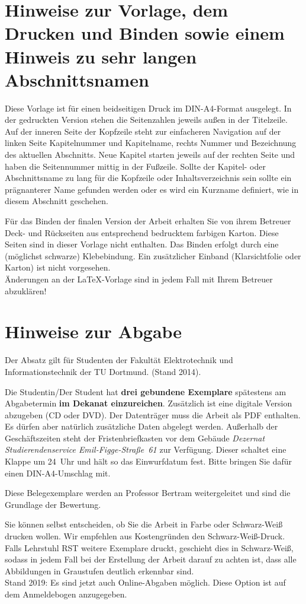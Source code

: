 \section[Vorlage, Drucken und Binden]{Hinweise zur Vorlage, dem Drucken und Binden sowie einem Hinweis zu sehr langen Abschnittsnamen}
\label{hinweise:vorlage}

Diese Vorlage ist für einen beidseitigen Druck im DIN-A4-Format ausgelegt. In der gedruckten Version stehen die Seitenzahlen jeweils außen in der Titelzeile. Auf der inneren Seite der Kopfzeile steht zur einfacheren Navigation auf der linken Seite Kapitelnummer und Kapitelname, rechts Nummer und Bezeichnung des aktuellen Abschnitts. Neue Kapitel starten jeweils auf der rechten Seite und haben die Seitennummer mittig in der Fußzeile.
Sollte der Kapitel- oder Abschnittsname zu lang für die Kopfzeile oder Inhaltsverzeichnis sein sollte ein prägnanterer Name gefunden werden oder es wird ein Kurzname definiert, wie in diesem Abschnitt geschehen.

Für das Binden der finalen Version der Arbeit erhalten Sie von ihrem Betreuer Deck- und Rückseiten aus entsprechend bedrucktem farbigen Karton. Diese Seiten sind in dieser Vorlage nicht enthalten. Das Binden erfolgt durch eine (möglichst schwarze) Klebebindung. Ein zusätzlicher Einband (Klarsichtfolie oder Karton) ist nicht vorgesehen.\\

Änderungen an der \LaTeX-Vorlage sind in jedem Fall mit Ihrem Betreuer abzuklären!\\


\section{Hinweise zur Abgabe}
\label{hinweise:abgabe}

Der Absatz gilt für Studenten der Fakultät Elektrotechnik und Informationstechnik der TU Dortmund. (Stand 2014).

Die Studentin/Der Student hat \textbf{drei gebundene Exemplare} spätestens am Abgabetermin \textbf{im Dekanat einzureichen}. Zusätzlich ist eine digitale Version abzugeben (CD oder DVD). Der Datenträger muss die Arbeit als PDF enthalten. Es dürfen aber natürlich zusätzliche Daten abgelegt werden. Außerhalb der Geschäftszeiten steht der Fristenbriefkasten vor dem Gebäude \textit{Dezernat Studierendenservice Emil-Figge-Straße~61} zur Verfügung. Dieser schaltet eine Klappe um 24~Uhr und hält so das Einwurfdatum fest. Bitte bringen Sie dafür einen DIN-A4-Umschlag mit.

Diese Belegexemplare werden an Professor Bertram weitergeleitet und sind die Grundlage der Bewertung.

Sie können selbst entscheiden, ob Sie die Arbeit in Farbe oder Schwarz-Weiß drucken wollen. Wir empfehlen aus Kostengründen den Schwarz-Weiß-Druck. Falls Lehrstuhl RST weitere Exemplare druckt, geschieht dies in Schwarz-Weiß, sodass in jedem Fall bei der Erstellung der Arbeit darauf zu achten ist, dass alle Abbildungen in Graustufen deutlich erkennbar sind.\\

Stand 2019: Es sind jetzt auch Online-Abgaben möglich. Diese Option ist auf dem Anmeldebogen anzugegeben.
